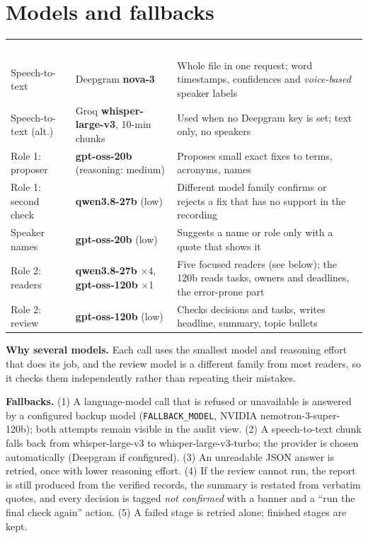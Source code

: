 \documentclass[10pt,a4paper]{article}
\newcommand{\code}[1]{\texttt{\small #1}}
\newcommand{\HC}[1]{\textcolor{white}{\textbf{#1}}}
\begin{document}
\section{Models and fallbacks}
\begin{tabularx}{\textwidth}{@{}L{3.2cm}L{4.1cm}Y@{}}
\HC{Role}&\HC{Model}&\HC{Purpose}\\
Speech-to-text & Deepgram \textbf{nova-3} & Whole file in one request; word timestamps, confidences and \emph{voice-based} speaker labels\\
Speech-to-text (alt.) & Groq \textbf{whisper-large-v3}, 10-min chunks & Used when no Deepgram key is set; text only, no speakers\\
Role 1: proposer & \textbf{gpt-oss-20b} (reasoning: medium) & Proposes small exact fixes to terms, acronyms, names\\
Role 1: second check & \textbf{qwen3.8-27b} (low) & Different model family confirms or rejects a fix that has no support in the recording\\
Speaker names & \textbf{gpt-oss-20b} (low) & Suggests a name or role only with a quote that shows it\\
Role 2: readers & \textbf{qwen3.8-27b} $\times$4, \textbf{gpt-oss-120b} $\times$1 & Five focused readers (see below); the 120b reads tasks, owners and deadlines, the error-prone part\\
Role 2: review & \textbf{gpt-oss-120b} (low) & Checks decisions and tasks, writes headline, summary, topic bullets\\
\end{tabularx}

\textbf{Why several models.} Each call uses the smallest model and reasoning effort that does its job, and the review model is a different family from most readers, so it checks them independently rather than repeating their mistakes.

\textbf{Fallbacks.} (1) A language-model call that is refused or unavailable is answered by a configured backup model (\code{FALLBACK\_MODEL}, NVIDIA nemotron-3-super-120b); both attempts remain visible in the audit view. (2) A speech-to-text chunk falls back from whisper-large-v3 to whisper-large-v3-turbo; the provider is chosen automatically (Deepgram if configured). (3) An unreadable JSON answer is retried, once with lower reasoning effort. (4) If the review cannot run, the report is still produced from the verified records, the summary is restated from verbatim quotes, and every decision is tagged \emph{not confirmed} with a banner and a ``run the final check again'' action. (5) A failed stage is retried alone; finished stages are kept.
\end{document}
